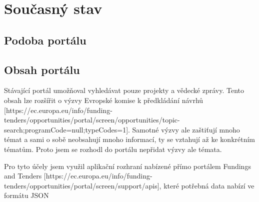 \chapter{Současný stav}

\section{Podoba portálu}


\section{Obsah portálu}
Stávající portál umožňoval vyhledávat pouze projekty a vědecké zprávy. Tento obsah lze rozšířit o výzvy Evropské komise k předkládání návrhů [https://ec.europa.eu/info/funding-tenders/opportunities/portal/screen/opportunities/topic-search;programCode=null;typeCodes=1]. Samotné výzvy ale zaštiťují mnoho témat a sami o sobě neobsahují mnoho informací, ty se vztahují až ke konkrétním tématům. Proto jsem se rozhodl do portálu nepřidat výzvy ale témata.

Pro tyto účely jsem využil aplikační rozhraní nabízené přímo portálem Fundings and Tenders [https://ec.europa.eu/info/funding-tenders/opportunities/portal/screen/support/apis], které potřebná data nabízí ve formátu JSON